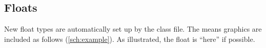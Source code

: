 \documentclass[12pt]{article}
\begin{document}
\subsection{Floats}

New float types are automatically set up by the class file.  The
means graphics are included as follows (\ref{sch:example}).  As
illustrated, the float is ``here'' if possible.













\end{document}
